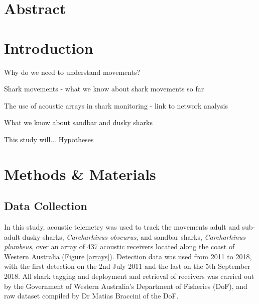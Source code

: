 \documentclass[11pt,a4paper]{article}
\begin{document}
	
	
	\linenumbers
	\newpage
	
	\section{Abstract}
	
	
	\newpage
	
	\section{Introduction}
	
	Why do we need to understand movements?
	
	Shark movements - what we know about shark movements so far
	
	The use of acoustic arrays in shark monitoring
		- link to network analysis
	
	What we know about sandbar and dusky sharks
	
	This study will...
	Hypotheses
	
	\newpage
	
	\section{Methods \& Materials}
	
	\subsection{Data Collection}
	
	In this study, acoustic telemetry was used to track the movements adult and sub-adult dusky sharks, \textit{Carcharhinus obscurus}, and sandbar sharks, \textit{Carcharhinus plumbeus}, over an array of 437 acoustic receivers located along the coast of Western Australia (Figure \ref{arrays}). Detection data was used from 2011 to 2018, with the first detection on the 2nd July 2011 and the last on the 5th September 2018. All shark tagging and deployment and retrieval of receivers was carried out by the Government of Western Australia’s Department of Fisheries (DoF), and raw dataset compiled by Dr Matias Braccini of the DoF.\\
	\\
	
\end{document}
